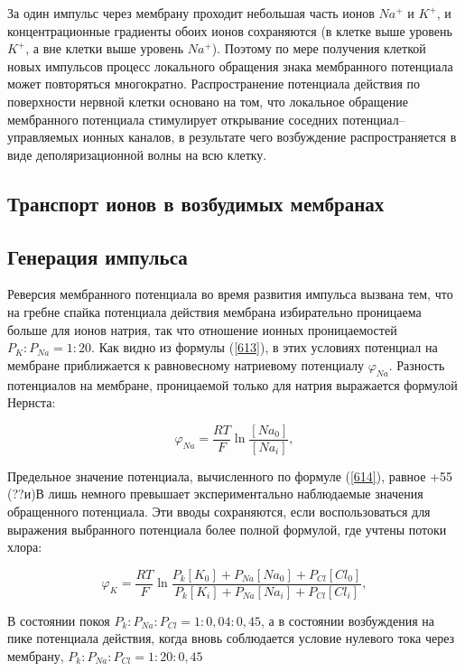 \documentclass[12pt,a4paper,oneside]{book}
\begin{document}
За один импульс через мембрану проходит небольшая часть ионов $Na^+$ и $K^+$, и концентрационные градиенты обоих ионов сохраняются (в клетке выше уровень $K^+$, а вне клетки выше уровень $Na^+$). Поэтому по мере получения клеткой новых импульсов процесс локального обращения знака мембранного потенциала может повторяться многократно. Распространение потенциала действия по поверхности нервной клетки основано на том, что локальное обращение мембранного потенциала стимулирует открывание соседних потенциал--управляемых ионных каналов, в результате чего возбуждение распространяется в виде деполяризационной волны на всю клетку.

\subsection{Транспорт ионов в возбудимых мембранах}


\subsection{Генерация импульса}


Реверсия мембранного потенциала во время развития импульса вызвана тем, что на гребне спайка потенциала действия мембрана избирательно проницаема больше для ионов натрия, так что отношение ионных проницаемостей $P_K:P_{Na}=1:20$. Как видно из формулы (\ref{613}), в этих условиях потенциал на мембране приближается к равновесному натриевому потенциалу $\varphi_{Na}$. Разность потенциалов на мембране, проницаемой только для натрия выражается формулой Нернста:

\begin{equation}
	\label{614}
	\varphi_{Na}=\frac{RT}{F} \ln \frac{[Na_0]}{[Na_i]},
\end{equation}

Предельное значение потенциала, вычисленного по формуле (\ref{614}), равное +55 (??и)В лишь немного превышает экспериментально наблюдаемые значения обращенного потенциала. Эти вводы сохраняются, если воспользоваться для выражения выбранного потенциала более полной формулой, где учтены потоки хлора:

\begin{equation}
\varphi_K=\frac{RT}{F} \ln \frac{P_k[K_0]+P_{Na}[Na_0]+P_{Cl}[Cl_0]}{P_k[K_i]+P_{Na}[Na_i]+P_{Cl}[Cl_i]},
\end{equation}

В состоянии покоя $P_k : P_{Na} : P_{Cl}=1:0{,}04:0{,}45$, а в состоянии возбуждения на пике потенциала действия, когда вновь соблюдается условие нулевого тока через мембрану, $P_k : P_{Na} : P_{Cl}=1:20:0{,}45$
\end{document}
